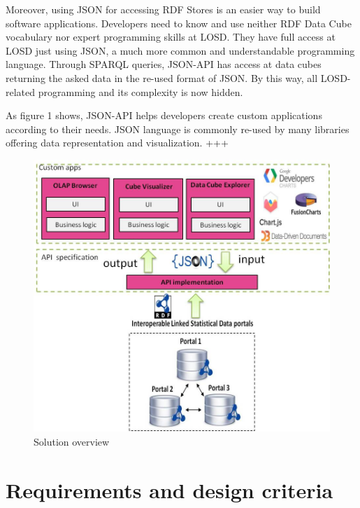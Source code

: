 \documentclass{llncs}
\begin{document}
Moreover, using JSON for accessing RDF Stores is an easier way to build software applications. Developers need to know and use neither RDF Data Cube vocabulary nor expert programming skills at LOSD. They have full access at LOSD just using JSON, a much more common and understandable programming language. Through SPARQL queries, JSON-API has access at data cubes returning the asked data in the re-used format of JSON. By this way, all LOSD-related programming and its complexity is now hidden.

As figure 1 shows, JSON-API helps developers create custom applications according to their needs. JSON language is commonly re-used by many libraries offering data representation and visualization. +++


\begin{figure}
  \includegraphics{images/overview.jpg}
\caption{Solution overview}
\label{fig:overview}
\end{figure}


\section{Requirements and design criteria}\label{sec:reqs}
\end{document}
